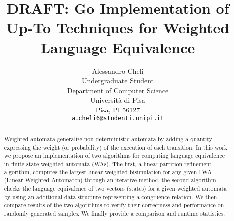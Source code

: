 \documentclass{article}
\title{DRAFT: Go Implementation of Up-To Techniques for Weighted Language Equivalence}
\author{
  Alessandro Cheli \\
  Undergraduate Student \\
  Department of Computer Science \\
  Università di Pisa\\
  Pisa, PI 56127 \\
  \texttt{a.cheli6@studenti.unipi.it} \\
}
\theoremstyle{plain}%
\theoremstyle{definition}
\theoremstyle{remark}
\begin{document}
\maketitle

\begin{abstract}
Weighted automata generalize non-deterministic automata by adding
a quantity expressing the weight (or probability) of the execution of each transition.
In this work we propose an implementation of two algorithms for computing language 
equivalence in finite state weighted automata (WAs). The first, a
linear partition refinement algorithm, computes the largest linear weighted bisimulation
for any given LWA (Linear Weighted Automaton) through an iterative method, 
the second algorithm checks the language equivalence 
of two vectors (states) for a given weighted automata by using an additional
data structure representing a congruence relation.
We then compare results of the two algorithms to verify their correctness
and performance on randomly generated samples. 
We finally provide a comparison and runtime statistics.
\end{abstract}





























 

\appendix

%
\end{document}
